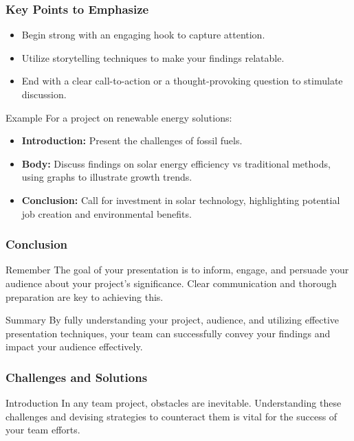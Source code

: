\documentclass[aspectratio=169]{beamer}
\begin{document}
\begin{frame}[fragile]
    \frametitle{Key Points to Emphasize}
    
    \begin{itemize}
        \item Begin strong with an engaging hook to capture attention.
        \item Utilize storytelling techniques to make your findings relatable.
        \item End with a clear call-to-action or a thought-provoking question to stimulate discussion.
    \end{itemize}
    
    \begin{block}{Example}
        For a project on renewable energy solutions:
        \begin{itemize}
            \item \textbf{Introduction:} Present the challenges of fossil fuels.
            \item \textbf{Body:} Discuss findings on solar energy efficiency vs traditional methods, using graphs to illustrate growth trends.
            \item \textbf{Conclusion:} Call for investment in solar technology, highlighting potential job creation and environmental benefits.
        \end{itemize}
    \end{block}
\end{frame}

\begin{frame}[fragile]
    \frametitle{Conclusion}
    
    \begin{block}{Remember}
        The goal of your presentation is to inform, engage, and persuade your audience about your project's significance. Clear communication and thorough preparation are key to achieving this.
    \end{block}
    
    \begin{block}{Summary}
        By fully understanding your project, audience, and utilizing effective presentation techniques, your team can successfully convey your findings and impact your audience effectively.
    \end{block}
\end{frame}

\begin{frame}[fragile]
    \frametitle{Challenges and Solutions}
    \begin{block}{Introduction}
        In any team project, obstacles are inevitable. Understanding these challenges and devising strategies to counteract them is vital for the success of your team efforts.
    \end{block}
\end{frame}
\end{document}
